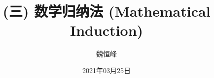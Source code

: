 \documentclass[]{beamer}
\title[(三) 数学归纳法 (Induction)]{(三) 数学归纳法 (Mathematical Induction)}
\author[魏恒峰]{\large 魏恒峰}
\institute{hfwei@nju.edu.cn}
\date{2021年03月25日}
\begin{document}
\maketitle







\thankyou{}

\end{document}
